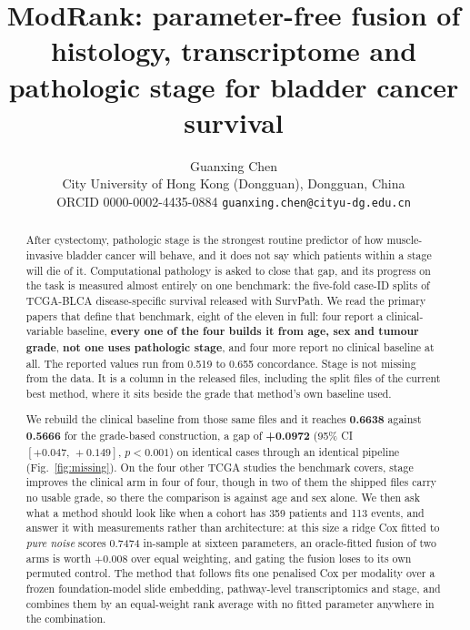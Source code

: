 \documentclass[11pt]{article}
\title{ModRank: parameter-free fusion of histology, transcriptome and pathologic stage for bladder cancer survival}
\author{Guanxing Chen\\
\small City University of Hong Kong (Dongguan), Dongguan, China\\
\small ORCID 0000-0002-4435-0884 \quad \texttt{guanxing.chen@cityu-dg.edu.cn}}
\date{}
\begin{document}
\maketitle

\begin{abstract}
\noindent
After cystectomy, pathologic stage is the strongest routine predictor of how muscle-invasive bladder
cancer will behave, and it does not say which patients within a stage will die of it. Computational pathology is asked to close that gap,
and its progress on the task is measured almost entirely on one benchmark: the five-fold case-ID
splits of TCGA-BLCA disease-specific survival released with SurvPath. We read the primary papers
that define that benchmark, eight of the eleven in full: four report a clinical-variable baseline, \textbf{every one of the four
builds it from age, sex and tumour grade}, \textbf{not one uses pathologic stage}, and four more
report no clinical baseline at all. The reported values run from 0.519 to 0.655 concordance. Stage is not missing from the data. It is a column in the released files, including the split files of the current best
method, where it sits beside the grade that method's own baseline used.

We rebuild the clinical baseline from those same files and it reaches \textbf{0.6638} against
\textbf{0.5666} for the grade-based construction, a gap of \textbf{+0.0972} (95\% CI
$[+0.047,\,+0.149]$, $p<0.001$) on identical cases
through an identical pipeline (Fig.~\ref{fig:missing}). On the four other TCGA studies the
benchmark covers, stage improves the clinical arm in four of four, though in two of them the
shipped files carry no usable grade, so there the comparison is against age and sex alone. We then ask what a method should look like when a cohort has 359 patients
and 113 events, and answer it with measurements rather than architecture: at this size a ridge Cox
fitted to \emph{pure noise} scores 0.7474 in-sample at sixteen parameters, an oracle-fitted fusion
of two arms is worth $+0.008$ over equal weighting, and gating the fusion loses to its own permuted
control. The method that follows fits one penalised Cox per modality over a frozen foundation-model
slide embedding, pathway-level transcriptomics and stage, and combines them by an equal-weight rank
average with no fitted parameter anywhere in the combination.


\end{abstract}
\end{document}
